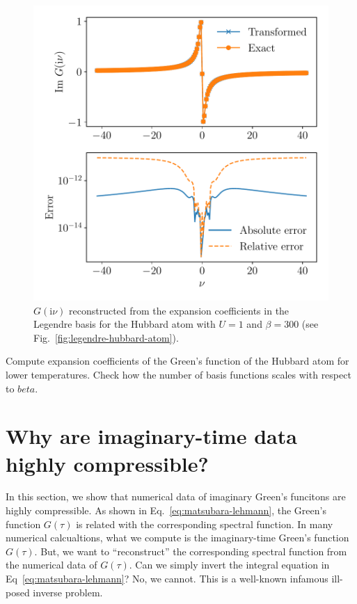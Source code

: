 \documentclass[submission, LectureNotes]{SciPost}
\newcommand\ii{\mathrm{i}}%
\newcommand\iv{\ii\nu}%
\begin{document}
\begin{figure}
    \centering
    \includegraphics[width=0.8\columnwidth]{legendre_matsu_hubbard_atom.pdf}
    \caption{
        $G(\iv)$ reconstructed from the expansion coefficients in the Legendre basis
        for the Hubbard atom with $U=1$ and $\beta=300$ (see Fig.~\ref{fig:legendre-hubbard-atom}).
        }
    \label{fig:legendre-matsu-hubbard-atom}
\end{figure}


\begin{Exercise}
    Compute expansion coefficients of the Green's function of the Hubbard atom
    for lower temperatures.
    Check how the number of basis functions scales with respect to $beta$.
\end{Exercise}



\clearpage
\section{Why are imaginary-time data highly compressible?}
In this section, we show that numerical data of imaginary Green's funcitons are highly compressible.
As shown in Eq.~\eqref{eq:matsubara-lehmann},
the Green's function $G(\tau)$ is related with the corresponding spectral function.
In many numerical calcualtions, what we compute is the imaginary-time Green's function $G(\tau)$.
But, we want to ``reconstruct'' the corresponding spectral function from the numerical data of $G(\tau)$.
Can we simply invert the integral equation in Eq~\eqref{eq:matsubara-lehmann}?
No, we cannot.
This is a well-known infamous ill-posed inverse problem.
\end{document}
